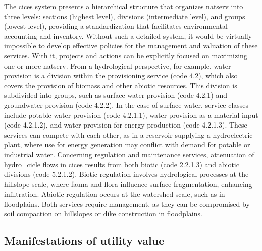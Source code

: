 \documentclass[./main_en.tex]{subfiles}
\begin{document}
\par The \acrshort{cices} system presents a hierarchical structure that organizes \gls{natserv} into three levels: sections (highest level), divisions (intermediate level), and groups (lowest level), providing a standardization that facilitates environmental accounting and inventory. Without such a detailed \gls{system}, it would be virtually impossible to develop effective policies for the management and valuation of these services. With it, projects and actions can be explicitly focused on maximizing one or more \gls{natserv}. From a hydrological perspective, for example, water provision is a division within the provisioning service (code 4.2), which also covers the provision of biomass and other abiotic resources. This division is subdivided into groups, such as surface water provision (code 4.2.1) and groundwater provision (code 4.2.2). In the case of surface water, service classes include potable water provision (code 4.2.1.1), water provision as a material input (code 4.2.1.2), and water provision for energy production (code 4.2.1.3). These services can compete with each other, as in a reservoir supplying a hydroelectric plant, where use for energy generation may conflict with demand for potable or industrial water. Concerning regulation and maintenance services, attenuation of \gls{hydro_cicle} flows in \acrshort{cices} results from both biotic (code 2.2.1.3) and abiotic divisions (code 5.2.1.2). Biotic regulation involves hydrological processes at the hillslope scale, where fauna and flora influence surface fragmentation, enhancing infiltration. Abiotic regulation occurs at the watershed scale, such as in floodplains. Both services require management, as they can be compromised by soil compaction on hillslopes or dike construction in floodplains.

\subsection{Manifestations of utility value} \label{sec:natserv:value}
\end{document}

